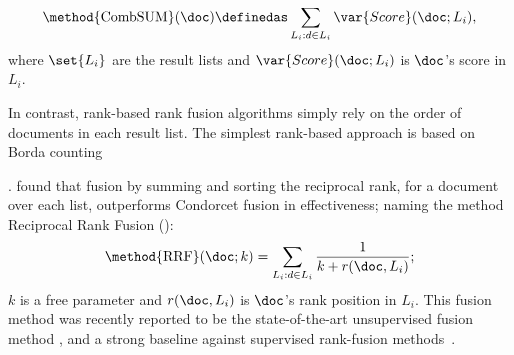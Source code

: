 \begin{equation}
  \label{eq:combsum}
  \mbox{\method{CombSUM}} (\doc) \definedas \sum_{L_i: d \in L_i}\var{Score}(\doc;L_i),
\end{equation}
where $\set{L_i}$ are the result lists and $\var{Score}(\doc;L_i)$ is $\doc$'s score in $L_i$.


In contrast, rank-based rank fusion algorithms simply rely on the
order of documents in each
result list.
The simplest rank-based approach is based on Borda counting
~{\cite{borda1784memoire}.
{\citet{cormack2009reciprocal}} found that fusion by summing and
sorting the reciprocal rank, for a document over each list,
outperforms Condorcet fusion in effectiveness; naming the method
Reciprocal Rank Fusion ():
\begin{equation} \label{eq:rrf}
    \mbox{\method{RRF}}(\doc;k) = \sum_{L_i:d \in L_i}{} \frac{1}{k + r(\doc,L_i)};
\end{equation}
$k$ is a free parameter 
and $r(\doc,L_i)$ is $\doc$'s rank position in $L_i$.
This
fusion method was recently reported to be the state-of-the-art unsupervised fusion method \cite{Anava+al:16a}, 
and a strong baseline
against supervised rank-fusion methods~{\citep{lee2015optimization}}.





}
